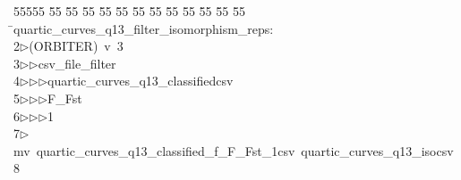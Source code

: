 %
%
\begin{tabbing}
55555 \= 55 \= 55 \= 55 \= 55 \= 55 \= 55 \= 55 \= 55 \= 55 \= 55 \= 55 \= 55 \= \>quartic\_curves\_q13\_filter\_isomorphism\_reps:\\[0pt]
2\>$\triangleright$\>(ORBITER)\ v\ 3\ \\[0pt]
3\>$\triangleright$\>$\triangleright$\>csv\_file\_filter\ \\[0pt]
4\>$\triangleright$\>$\triangleright$\>$\triangleright$\>quartic\_curves\_q13\_classifiedcsv\ \\[0pt]
5\>$\triangleright$\>$\triangleright$\>$\triangleright$\>F\_Fst\ \\[0pt]
6\>$\triangleright$\>$\triangleright$\>$\triangleright$\>1\ \\[0pt]
7\>$\triangleright$\>mv\ quartic\_curves\_q13\_classified\_f\_F\_Fst\_1csv\ quartic\_curves\_q13\_isocsv\\[0pt]
8\>\end{tabbing}
